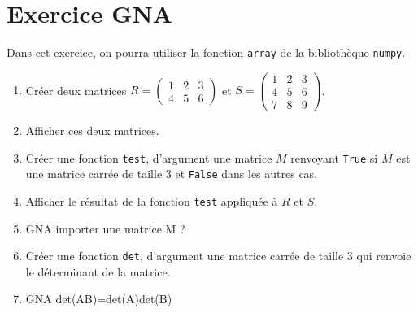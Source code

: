 \section*{Exercice GNA}
Dans cet exercice, on pourra utiliser la fonction \verb?array? de la bibliothèque \verb?numpy?.
\begin{enumerate}
\item Créer deux matrices $R=\begin{pmatrix}
1&2&3\\4&5&6
\end{pmatrix}$ et $S=\begin{pmatrix}
1&2&3\\4&5&6\\7&8&9
\end{pmatrix}$.
\item Afficher ces deux matrices.
\item Créer une fonction \verb?test?, d'argument une matrice $M$ renvoyant \verb?True? si $M$ est une matrice carrée de taille $3$ et \verb?False? dans les autres cas.
\item Afficher le résultat de la fonction \verb?test? appliquée à $R$ et $S$.
\item GNA importer une matrice M ?
\item Créer une fonction \verb?det?, d'argument une matrice carrée de taille 3 qui renvoie le déterminant de la matrice.
\item GNA det(AB)=det(A)det(B)
\end{enumerate}


